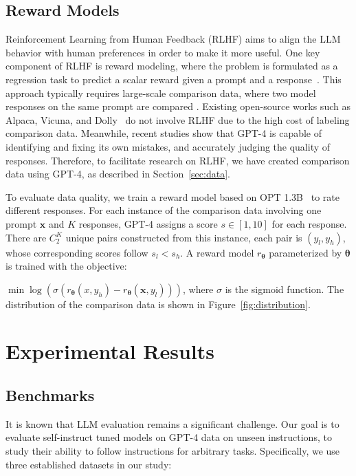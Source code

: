 \subsection{Reward Models} Reinforcement Learning from Human Feedback (RLHF) aims to align the LLM behavior with human preferences in order to make it more useful. One key component of RLHF is reward modeling, where the problem is formulated as a regression task to predict a scalar reward given a prompt and a response~\citep{askell2021general, ouyang2022training}. This approach typically requires large-scale comparison data, where two model responses on the same prompt are compared \cite{ouyang2022training}. Existing open-source works such as Alpaca, Vicuna, and Dolly~\citep{dolly} do not involve RLHF due to the high cost of labeling comparison data. Meanwhile, recent studies show that GPT-4 is capable of identifying and fixing its own mistakes, and accurately judging the quality of responses\citep{peng2023check, bai2022constitutional, madaan2023selfrefine, kim2023language}. Therefore, to facilitate research on RLHF, we have created comparison data using GPT-4, as described in Section~\ref{sec:data}. 

To evaluate data quality, we train a reward model based on OPT 1.3B~\citep{iyer2022opt} to rate different responses. For each instance of the comparison data involving one prompt $\boldsymbol{x}$ and $K$ responses, GPT-4 assigns a score $s \in [1,10]$ for each response. There are $C_2^K$ unique pairs constructed from this instance, each pair is $(y_l, y_h)$, whose corresponding scores follow $s_l < s_h$. A reward model $r_{\boldsymbol{\theta}}$ parameterized by $\boldsymbol{\theta}$ is trained with the objective:   

$\min \log( \sigma(r_{\boldsymbol{\theta}}(x, y_h) - r_{\boldsymbol{\theta}}(\boldsymbol{x}, y_l)) )$, where $\sigma$ is the sigmoid function. The distribution of the comparison data is shown in Figure~\ref{fig:distribution}.

\section{Experimental Results}

\subsection{Benchmarks}

It is known that LLM evaluation remains a significant challenge. Our goal is to evaluate self-instruct tuned models on GPT-4 data on unseen instructions, to study their ability to follow instructions for arbitrary tasks. Specifically, we use three established datasets in our study:

